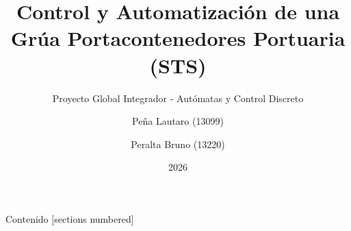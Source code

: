 \documentclass[10pt,aspectratio=169]{beamer}
\title{Control y Automatización de una\\Grúa Portacontenedores Portuaria (STS)}
\subtitle{Proyecto Global Integrador - Autómatas y Control Discreto}
\author{Peña Lautaro (13099) \and Peralta Bruno (13220)}
\institute{Ing. Mecatrónica --- UNCuyo}
\date{2026}
\newcommand{\lautimode}{\setbeamercolor{background canvas}{bg=teal!8}}
\newcommand{\defaultmode}{\setbeamercolor{background canvas}{bg=}}
\begin{document}
\maketitle

\begin{frame}{Contenido}
  [sections numbered]
  {\footnotesize\tableofcontents[hideallsubsections]}
\end{frame}
















% 


\end{document}
